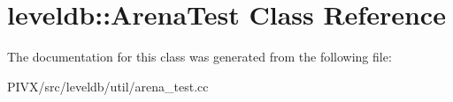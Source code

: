 \hypertarget{classleveldb_1_1_arena_test}{}\section{leveldb\+:\+:Arena\+Test Class Reference}
\label{classleveldb_1_1_arena_test}


The documentation for this class was generated from the following file\+:\begin{DoxyCompactItemize}
\item 
P\+I\+V\+X/src/leveldb/util/arena\+\_\+test.\+cc\end{DoxyCompactItemize}
